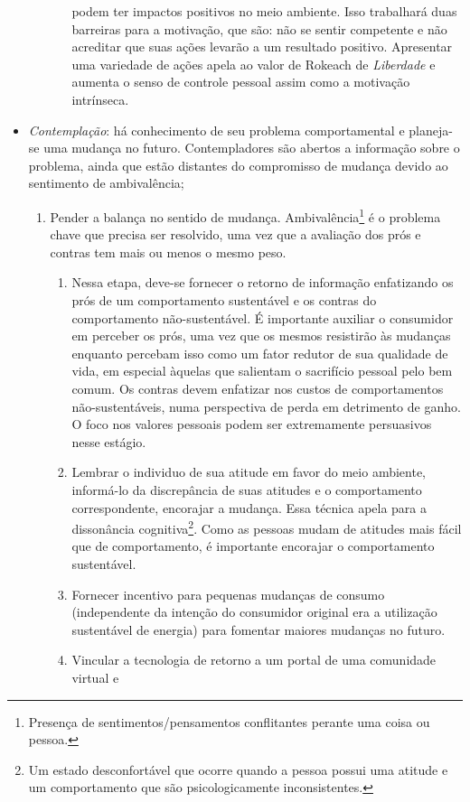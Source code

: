\begin{itemize}
\begin{enumerate}
\begin{enumerate}
podem ter impactos positivos no meio ambiente. Isso trabalhará duas
barreiras para a motivação, que são: não se sentir competente e não acreditar
que suas ações levarão a um resultado positivo. Apresentar uma variedade de
ações apela ao valor de Rokeach de \emph{Liberdade} e aumenta o senso de
controle pessoal assim como a motivação intrínseca.
\end{enumerate}
\end{enumerate}
\item \emph{Contemplação}: há conhecimento de seu problema comportamental e
planeja-se uma mudança no futuro. Contempladores são abertos a informação sobre
o problema, ainda que estão distantes do compromisso de mudança devido ao
sentimento de ambivalência;
\begin{enumerate}
\item Pender a balança no sentido de mudança. Ambivalência\footnote{Presença de
sentimentos/pensamentos conflitantes perante uma coisa ou pessoa.} é o problema chave
que precisa ser resolvido, uma vez que a avaliação dos prós e contras tem mais
ou menos o mesmo peso.
\begin{enumerate}
\item Nessa etapa, deve-se fornecer o retorno de informação enfatizando os prós de um
comportamento sustentável e os contras do comportamento não-sustentável. É
importante auxiliar o consumidor em perceber os prós, uma vez que os mesmos
resistirão às mudanças enquanto percebam isso como um fator redutor de sua
qualidade de vida, em especial àquelas que salientam o sacrifício pessoal pelo
bem comum. Os contras devem enfatizar nos custos de comportamentos
não-sustentáveis, numa perspectiva de perda em detrimento de ganho. O foco nos
valores pessoais podem ser extremamente persuasivos nesse estágio.
\item Lembrar o individuo de sua atitude em favor do meio ambiente, informá-lo
da discrepância de suas atitudes e o comportamento correspondente, encorajar a
mudança. Essa técnica apela para a dissonância cognitiva\footnote{Um estado
desconfortável que ocorre quando a pessoa possui uma atitude e um comportamento
que são psicologicamente inconsistentes.}. Como as pessoas mudam de atitudes mais
fácil que de comportamento, é importante encorajar o comportamento sustentável.
\item Fornecer incentivo para pequenas mudanças de consumo (independente da
intenção do consumidor original era a utilização sustentável de energia) para
fomentar maiores mudanças no futuro.
\item Vincular a tecnologia de retorno a um portal de uma comunidade virtual e

\end{enumerate}
\end{enumerate}
\end{itemize}
